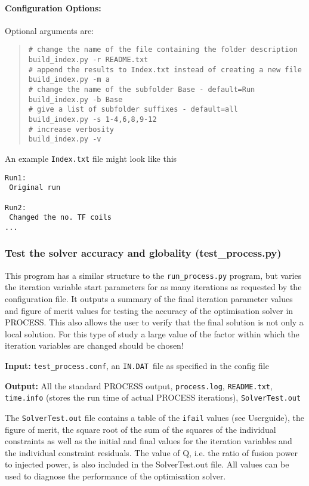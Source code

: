 \documentclass[11pt,a4paper]{article}
\newcommand{\indat}{\mbox{\texttt{IN.DAT}}}
\begin{document}
\paragraph{Configuration Options:}

Optional arguments are:
\begin{quote}
\begin{verbatim}
# change the name of the file containing the folder description
build_index.py -r README.txt
# append the results to Index.txt instead of creating a new file
build_index.py -m a
# change the name of the subfolder Base - default=Run
build_index.py -b Base
# give a list of subfolder suffixes - default=all
build_index.py -s 1-4,6,8,9-12
# increase verbosity
build_index.py -v
\end{verbatim}
\end{quote}

An example \texttt{Index.txt} file might look like this
\begin{framed}
\begin{verbatim}
Run1:
 Original run

Run2:
 Changed the no. TF coils
...
\end{verbatim}
\end{framed}


\subsubsection{Test the solver accuracy and globality (test\_process.py)}

This program has a similar structure to the \texttt{run\_process.py} program, but varies the iteration variable start parameters for as many iterations as requested by the configuration file. It outputs a summary of the final iteration parameter values and figure of merit values for testing the accuracy of the optimisation solver in PROCESS. This also allows the user to verify that the final solution is not only a local solution. For this type of study a large value of the factor within which the iteration variables are changed should be chosen!

\begin{description}
\item{\textbf{Input:}}
\texttt{test\_process.conf}, an \indat\ file as specified in the config file

\item{\textbf{Output:}} All the standard
  PROCESS output, \texttt{process.log}, \texttt{README.txt}, \texttt{time.info} (stores the run time of actual PROCESS iterations), \texttt{SolverTest.out}
\end{description}
The \texttt{SolverTest.out} file contains a table of the \texttt{ifail} values (see Userguide), the figure of merit, the square root of the sum of the squares of the individual constraints as well as the initial and final values for the iteration variables and the individual constraint residuals. The value of Q, i.e. the ratio of
fusion power to injected power, is also included in the SolverTest.out file. All values can be used to diagnose the performance of the optimisation solver.
\end{document}
